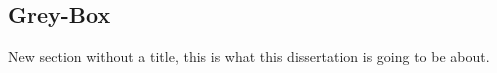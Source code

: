 \subsection{Grey-Box}



New section without a title, this is what this dissertation is going
to be about.








